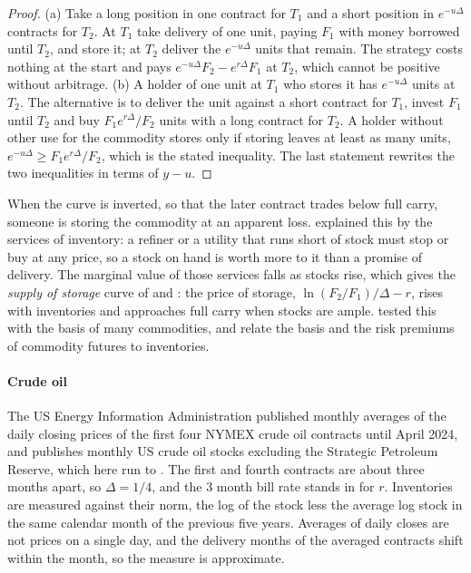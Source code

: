 \begin{chapterrefs}
\begin{proof}
(a) Take a long position in one
contract for $T_1$ and a short position in $e^{-u\Delta}$ contracts for $T_2$. At $T_1$ take delivery of
one unit, paying $F_1$ with money borrowed until $T_2$, and store it; at $T_2$ deliver the $e^{-u\Delta}$
units that remain. The strategy costs nothing at the start and pays $e^{-u\Delta}F_2-e^{r\Delta}F_1$ at
$T_2$, which cannot be positive without arbitrage.
(b) A holder of one unit at $T_1$ who stores it has $e^{-u\Delta}$ units at $T_2$. The alternative is to
deliver the unit against a short contract for $T_1$, invest $F_1$ until $T_2$ and buy
$F_1e^{r\Delta}/F_2$ units with a long contract for $T_2$. A holder without other use for the
commodity stores only if storing leaves at least as many units, $e^{-u\Delta}\ge F_1e^{r\Delta}/F_2$,
which is the stated inequality. The last statement rewrites the two inequalities in terms of $y-u$.
\end{proof}

When the curve is inverted, so that the later contract trades below full carry, someone is storing the
commodity at an apparent loss. \textcite{working1949} explained this by the services of inventory: a
refiner or a utility that runs short of stock must stop or buy at any price, so a stock on hand is worth
more to it than a promise of delivery. The marginal value of those services falls as stocks rise, which
gives the \emph{supply of storage} curve of \textcite{working1949} and \textcite{brennan1958}: the price of
storage, $\ln(F_2/F_1)/\Delta-r$, rises with inventories and approaches full carry when stocks are ample.
\textcite{famafrench1987} tested this with the basis of many commodities, and \textcite{gorton2013} relate
the basis and the risk premiums of commodity futures to inventories.

\paragraph{Crude oil}
The US Energy Information Administration published monthly averages of the daily closing prices of the
first four NYMEX crude oil contracts until April 2024, and publishes monthly US crude oil stocks excluding
the Strategic Petroleum Reserve, which here run to \sgStockLast. The first and fourth contracts are about
three months apart, so $\Delta=1/4$, and the 3 month bill rate stands in for $r$. Inventories are
measured against their norm, the log of the stock less the average log stock in the same calendar month
of the previous five years. Averages of daily closes are not prices on a single day, and the delivery
months of the averaged contracts shift within the month, so the measure is approximate.


\end{chapterrefs}
